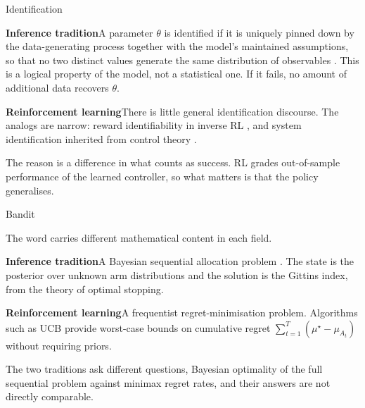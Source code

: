 \begin{frame}{Identification}

\textcolor{rlblue}{\textbf{Inference tradition}}\quad A parameter $\theta$ is identified if
it is uniquely pinned down by the data-generating process together with the model's
maintained assumptions, so that no two distinct values generate the same
distribution of observables \citep{Lewbel2019}. This is a \alert{logical} property
of the model, not a statistical one. If it fails, no amount of additional data
recovers $\theta$.

\bigskip
\textcolor{rlorange}{\textbf{Reinforcement learning}}\quad There is little general
identification discourse. The analogs are narrow: reward identifiability in inverse
RL \citep{KimGarg2021}, and system identification inherited from control theory
\citep{RossBagnell2012}.

\bigskip
The reason is a difference in what counts as success. RL grades out-of-sample
performance of the learned controller, so what matters is that the policy
generalises.
\end{frame}

\begin{frame}{Bandit}

The word carries different mathematical content in each field.

\bigskip
\textcolor{rlblue}{\textbf{Inference tradition}}\quad A Bayesian sequential allocation
problem \citep{Gittins1979}. The state is the posterior over unknown arm
distributions and the solution is the Gittins index, from the theory of optimal
stopping.

\bigskip
\textcolor{rlorange}{\textbf{Reinforcement learning}}\quad A frequentist
regret-minimisation problem. Algorithms such as UCB provide worst-case bounds on cumulative regret
$\sum_{t=1}^T (\mu^\star - \mu_{A_t})$ without requiring priors.

\bigskip
The two traditions ask different questions, Bayesian optimality of the full
sequential problem against minimax regret rates, and their answers are
\alert{not directly comparable}.
\end{frame}

